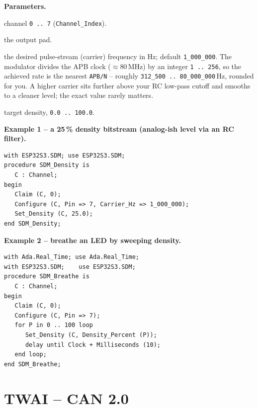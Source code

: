 \textbf{Parameters.}
\begin{description}[style=nextline]
\item[\texttt{Index}] channel \texttt{0\,..\,7} (\texttt{Channel\_Index}).
\item[\texttt{Pin}] the output pad.
\item[\texttt{Carrier\_Hz}] the desired pulse-stream (carrier) frequency in Hz;
  default \texttt{1\_000\_000}. The modulator divides the APB clock
  ($\approx$80\,MHz) by an integer \texttt{1\,..\,256}, so the achieved rate is
  the nearest \texttt{APB/N} -- roughly \texttt{312\_500\,..\,80\_000\_000}\,Hz,
  rounded for you. A higher carrier sits further above your RC low-pass cutoff and
  smooths to a cleaner level; the exact value rarely matters.
\item[\texttt{Percent}] target density, \texttt{0.0\,..\,100.0}.
\end{description}

\textbf{Example 1 -- a 25\,\% density bitstream (analog-ish level via an RC filter).}
\begin{lstlisting}
with ESP32S3.SDM; use ESP32S3.SDM;
procedure SDM_Density is
   C : Channel;
begin
   Claim (C, 0);
   Configure (C, Pin => 7, Carrier_Hz => 1_000_000);
   Set_Density (C, 25.0);
end SDM_Density;
\end{lstlisting}

\textbf{Example 2 -- breathe an LED by sweeping density.}
\begin{lstlisting}
with Ada.Real_Time; use Ada.Real_Time;
with ESP32S3.SDM;    use ESP32S3.SDM;
procedure SDM_Breathe is
   C : Channel;
begin
   Claim (C, 0);
   Configure (C, Pin => 7);
   for P in 0 .. 100 loop
      Set_Density (C, Density_Percent (P));
      delay until Clock + Milliseconds (10);
   end loop;
end SDM_Breathe;
\end{lstlisting}

\section{TWAI -- CAN 2.0}

